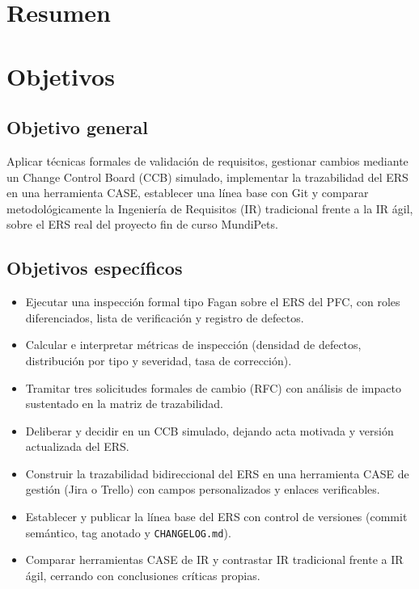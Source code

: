 \documentclass[journal,onecolumn]{IEEEtran}
\begin{document}
	\tableofcontents
	\newpage
	\listoffigures
	\newpage
	\listoftables
	\newpage
	
	
	\section{Resumen}
	\newpage
	
	\section{Objetivos}
	\subsection{Objetivo general}
	
	Aplicar técnicas formales de validación de requisitos, gestionar cambios mediante un Change Control Board (CCB) simulado, implementar la trazabilidad del ERS en una herramienta CASE, establecer una línea base con Git y comparar metodológicamente la Ingeniería de Requisitos (IR) tradicional frente a la IR ágil, sobre el ERS real del proyecto fin de curso MundiPets.
	
	\subsection{Objetivos específicos}
	
	\begin{itemize}
		\item Ejecutar una inspección formal tipo Fagan sobre el ERS del PFC, con roles diferenciados, lista de verificación y registro de defectos.
		\item Calcular e interpretar métricas de inspección (densidad de defectos, distribución por tipo y severidad, tasa de corrección).
		\item Tramitar tres solicitudes formales de cambio (RFC) con análisis de impacto sustentado en la matriz de trazabilidad.
		\item Deliberar y decidir en un CCB simulado, dejando acta motivada y versión actualizada del ERS.
		\item Construir la trazabilidad bidireccional del ERS en una herramienta CASE de gestión (Jira o Trello) con campos personalizados y enlaces verificables.
		\item Establecer y publicar la línea base del ERS con control de versiones (commit semántico, tag anotado y \texttt{CHANGELOG.md}).
		\item Comparar herramientas CASE de IR y contrastar IR tradicional frente a IR ágil, cerrando con conclusiones críticas propias.
	\end{itemize}
	
\end{document}
